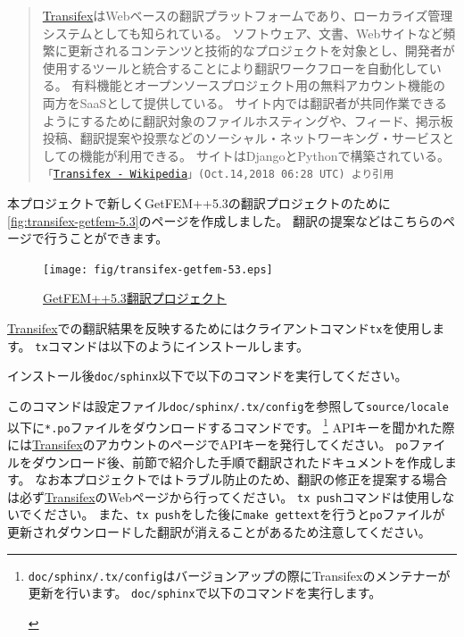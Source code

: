 \documentclass{../../style/ltjoc}
\begin{document}
\begin{quote}
\href{https://www.transifex.com}{Transifex}はWebベースの翻訳プラットフォームであり、ローカライズ管理システムとしても知られている。 
ソフトウェア、文書、Webサイトなど頻繁に更新されるコンテンツと技術的なプロジェクトを対象とし、開発者が使用するツールと統合することにより翻訳ワークフローを自動化している。
有料機能とオープンソースプロジェクト用の無料アカウント機能の両方をSaaSとして提供している。
サイト内では翻訳者が共同作業できるようにするために翻訳対象のファイルホスティングや、フィード、掲示板投稿、翻訳提案や投票などのソーシャル・ネットワーキング・サービスとしての機能が利用できる。
サイトはDjangoとPythonで構築されている。
\texttt{「\href{https://ja.wikipedia.org/wiki/Transifex}{Transifex - Wikipedia}」(Oct.14,2018 06:28 UTC) より引用}
\end{quote}
本プロジェクトで新しくGetFEM++5.3の翻訳プロジェクトのために\autoref{fig:transifex-getfem-5.3}のページを作成しました。
翻訳の提案などはこちらのページで行うことができます。
\begin{figure}[htbp]
\centering
\texttt{[image: fig/transifex-getfem-53.eps]}
\caption{\href{https://www.transifex.com/getfem-doc/getfem-53-1/dashboard/}{GetFEM++5.3翻訳プロジェクト}}
\label{fig:transifex-getfem-5.3}
\end{figure}
\href{https://www.transifex.com}{Transifex}での翻訳結果を反映するためにはクライアントコマンド\texttt{tx}を使用します。
\texttt{tx}コマンドは以下のようにインストールします。
\begin{shbox}
\end{shbox}
インストール後\texttt{doc/sphinx}以下で以下のコマンドを実行してください。
\begin{shbox}
\end{shbox}
このコマンドは設定ファイル\texttt{doc/sphinx/.tx/config}を参照して\texttt{source/locale}以下に\texttt{*.po}ファイルをダウンロードするコマンドです。
\footnote{
\texttt{doc/sphinx/.tx/config}はバージョンアップの際にTransifexのメンテナーが更新を行います。
\texttt{doc/sphinx}で以下のコマンドを実行します。
\begin{shbox}
\end{shbox}
}
APIキーを聞かれた際には\href{https://www.transifex.com}{Transifex}のアカウントのページでAPIキーを発行してください。
\texttt{po}ファイルをダウンロード後、前節で紹介した手順で翻訳されたドキュメントを作成します。
なお本プロジェクトではトラブル防止のため、翻訳の修正を提案する場合は必ず\href{https://www.transifex.com}{Transifex}のWebページから行ってください。
\texttt{tx push}コマンドは使用しないでください。
また、\texttt{tx push}をした後に\texttt{make gettext}を行うと\texttt{po}ファイルが更新されダウンロードした翻訳が消えることがあるため注意してください。
\end{document}
